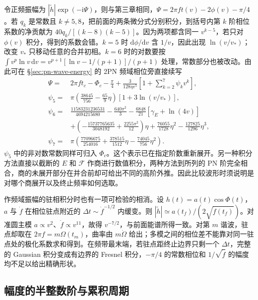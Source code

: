 令正频振幅为 $|\widetilde h|\exp(-\mathrm i\Psi)$，则与第三章相同，$\Psi=2\pi f t(v)-2\phi(v)-\pi/4$。若 $q_k$ 是常数且 $k\ne 5,8$，把前面的两条微分式分别积分，到括号内第 $k$ 阶相位系数的净贡献为 $40q_k/[(k-8)(k-5)]$。因为两项都含同一 $v^{k-5}$，若只对 $\phi(v)$ 积分，得到的系数会错。$k=5$ 时 $\mathrm d\phi/\mathrm dv$ 含 $1/v$，因此出现 $\ln(v/v_*)$；改变 $v_*$ 只移动任意的合并初相。$k=6$ 时的对数要按 $\int v^p\ln v\,\mathrm dv=v^{p+1}[\ln v-1/(p+1)]/(p+1)$ 处理，常数部分也被改动。由此可在 \S\ref{sec:pn-wave-energy} 的 2PN 频域相位旁直接续写
\begin{align*}
 \Psi={}&2\pi f t_c-\Phi_c-\tfrac\pi4
  +\frac{3}{128\eta v^5}\left[1+\sum_{k=2}^7\psi_k v^k\right],\\
 \psi_5={}&\pi\left(\frac{38645}{756}-\frac{65}{9}\eta\right)
                       [1+3\ln(v/v_*)],\\
 \psi_6={}&\frac{11583231236531}{4694215680}-\frac{640\pi^2}{3}
 -\frac{6848}{21}[\gamma_E+\ln(4v)]\\
 &+\left(-\frac{15737765635}{3048192}+\frac{2255\pi^2}{12}\right)\eta
 +\frac{76055}{1728}\eta^2-\frac{127825}{1296}\eta^3,\\
 \psi_7={}&\pi\left(\frac{77096675}{254016}+\frac{378515}{1512}\eta
                  -\frac{74045}{756}\eta^2\right).
\end{align*}
$\psi_5$ 中的非对数常数同样可归入 $\Phi_c$。这个表示已在指定阶数重新展开。另一种积分方法直接以截断的 $E$ 和 $\mathcal F$ 作商进行数值积分，两种方法到所列的 PN 阶完全相合，商的未展开部分在并合前却可给出不同的高阶外推。因此比较波形时须说明是对哪个商展开以及终止频率如何选取。

作频域振幅的驻相积分时也有一项可检验的相消。设 $h(t)=a(t)\cos\Phi(t)$，$a$ 与 $\dot f$ 在相位驻点附近的 $\Delta t\sim\dot f^{-1/2}$ 内缓变。则 $|\widetilde h|\simeq a(t_f)/(2\sqrt{\dot f(t_f)})$。对准圆主模 $a\propto v^2$、$\dot f\propto v^{11}$，故得 $v^{-7/2}$，与前面能谱所得一致。对第 $m$ 谐波，驻点却取在 $2\pi f=m\Omega(t_m)$，曲率由 $m\dot\Omega$ 给出；多模之间的相位差不能靠对同一驻点处的极化系数求和得到。在频带最末端，若驻点距终止边界只剩一个 $\Delta t$，完整的 Gaussian 积分变成有边界的 Fresnel 积分，$-\pi/4$ 的常数相位和 $1/\sqrt{\dot f}$ 的幅度均不足以给出精确形状。

\subsection{幅度的半整数阶与累积周期}

